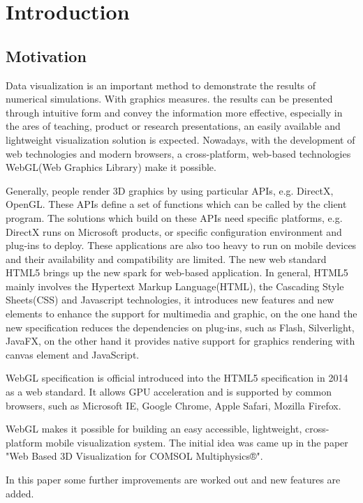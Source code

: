 \chapter{Introduction}

\section{Motivation}

Data visualization is an important method to demonstrate the results of numerical simulations. With graphics measures. the results can be presented through intuitive form and convey the information more effective, especially in the ares of teaching, product or research presentations, an easily available and lightweight visualization solution is expected. Nowadays, with the development of web technologies and modern browsers, a cross-platform, web-based technologies WebGL(Web Graphics Library) make it possible.

Generally, people render 3D graphics by using particular APIs, e.g. DirectX, OpenGL. These APIs define a set of functions which can be called by the client program. The solutions which build on these APIs need specific platforms, e.g. DirectX runs on Microsoft products, or specific configuration environment and plug-ins to deploy. These applications are also too heavy to run on mobile devices and their availability and compatibility are limited. The new web standard HTML5 brings up the new spark for web-based application. In general, HTML5 mainly involves the Hypertext Markup Language(HTML), the Cascading Style Sheets(CSS) and Javascript technologies, it introduces new features and new elements to enhance the support for multimedia and graphic, on the one hand the new specification reduces the dependencies on plug-ins, such as Flash, Silverlight, JavaFX, on the other hand it provides native support for graphics rendering with canvas element and JavaScript.

WebGL specification is official introduced into the HTML5 specification in 2014 as a web standard. It allows GPU acceleration and is supported by common browsers, such as Microsoft IE, Google Chrome, Apple Safari, Mozilla Firefox.

WebGL makes it possible for building an easy accessible, lightweight, cross-platform mobile visualization system.  The initial idea was came up in the paper "Web Based 3D Visualization for COMSOL Multiphysics®".

In this paper some further improvements are worked out and new features are added.

